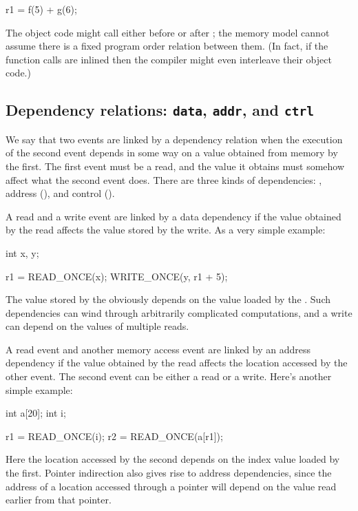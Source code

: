\begin{VerbatimU}
	r1 = f(5) + g(6);
\end{VerbatimU}

The object code might call  either before or after ; the
memory model cannot assume there is a fixed program order relation
between them.
(In fact, if the function calls are inlined then the compiler might
even interleave their object code.)


\subsection{Dependency relations: \texttt{data}, \texttt{addr}, and \texttt{ctrl}}
\label{sec:docs:explanation:Dependency relations: data, addr, and ctrl}

We say that two events are linked by a dependency relation when the
execution of the second event depends in some way on a value obtained
from memory by the first.
The first event must be a read, and the value it obtains must somehow
affect what the second event does.
There are three kinds of dependencies: , address (),
and control ().

A read and a write event are linked by a data dependency if the value
obtained by the read affects the value stored by the write.
As a very simple example:

\begin{VerbatimU}
	int x, y;

	r1 = READ_ONCE(x);
	WRITE_ONCE(y, r1 + 5);
\end{VerbatimU}

The value stored by the  obviously depends on the value
loaded by the .
Such dependencies can wind through arbitrarily complicated
computations, and a write can depend on the values of multiple reads.

A read event and another memory access event are linked by an address
dependency if the value obtained by the read affects the location
accessed by the other event.
The second event can be either a read or a write.
Here's another simple example:

\begin{VerbatimU}
	int a[20];
	int i;

	r1 = READ_ONCE(i);
	r2 = READ_ONCE(a[r1]);
\end{VerbatimU}

Here the location accessed by the second  depends on the
index value loaded by the first.
Pointer indirection also gives rise to address dependencies, since
the address of a location accessed through a pointer will depend on
the value read earlier from that pointer.

